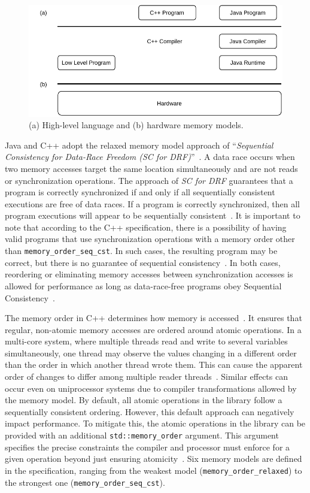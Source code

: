 \begin{figure}[ht!]
    \centering
    \includegraphics[width=0.9\linewidth]{contents//figures/III_3_memory_model.pdf}
    \caption{(a) High-level language and (b) hardware memory models.}
    \label{fig:memory-models}
\end{figure}

Java and C++ adopt the relaxed memory model approach of ``\emph{Sequential Consistency for Data-Race Freedom (SC for DRF)}''~\cite{DBLP_conf_isca_AdveH90}.  A data race occurs when two memory accesses target the same location simultaneously and are not reads or synchronization operations. The approach of \emph{SC for DRF} guarantees that a program is correctly synchronized if and only if all sequentially consistent executions are free of data races. If a program is correctly synchronized, then all program executions will appear to be sequentially consistent~\cite{javamemorymodelspec}. It is important to note that according to the C++ specification, there is a possibility of having valid programs that use synchronization operations with a memory order other than \texttt{memory\_order\_seq\_cst}. In such cases, the resulting program may be correct, but there is no guarantee of sequential consistency~\cite{DBLP_conf_pldi_BoehmA08}. In both cases, reordering or eliminating memory accesses between synchronization accesses is allowed for performance as long as data-race-free programs obey Sequential Consistency~\cite{DBLP_series_synthesis_2020Nagarajan}.

The memory order in C++ determines how memory is accessed~\cite{memoryOrderCpp2020}. It ensures that regular, non-atomic memory accesses are ordered around atomic operations. In a multi-core system, where multiple threads read and write to several variables simultaneously, one thread may observe the values changing in a different order than the order in which another thread wrote them. This can cause the apparent order of changes to differ among multiple reader threads~\cite{memoryOrderCpp2020}. Similar effects can occur even on uniprocessor systems due to compiler transformations allowed by the memory model. By default, all atomic operations in the library follow a sequentially consistent ordering. However, this default approach can negatively impact performance. To mitigate this, the atomic operations in the library can be provided with an additional \texttt{std::memory\_order} argument. This argument specifies the precise constraints the compiler and processor must enforce for a given operation beyond just ensuring atomicity~\cite{memoryOrderCpp2020}. Six memory models are defined in the specification, ranging from the weakest model (\texttt{memory\_order\_relaxed}) to the strongest one (\texttt{memory\_order\_seq\_cst}).

